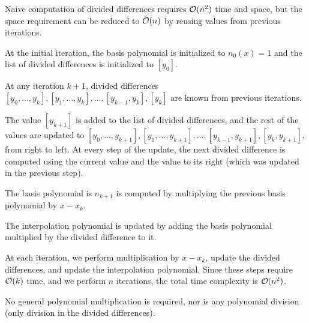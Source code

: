 Naive computation of divided differences requires $\mathcal{O}(n^2)$ time and space, but the space requirement can be reduced to $\mathcal{O}(n)$ by reusing values from previous iterations.

At the initial iteration, the basis polynomial is initialized to $n_0(x) = 1$ and the list of divided differences is initialized to $[y_0]$.

At any iteration $k + 1$, divided differences $[y_0, \ldots, y_k], [y_1, \ldots, y_k], \ldots, [y_{k-1}, y_k], [y_k]$ are known from previous iterations.

The value $[y_{k+1}]$ is added to the list of divided differences, and the rest of the values are updated to
$[y_0, \ldots, y_{k+1}], [y_1, \ldots, y_{k+1}], \ldots, [y_{k-1}, y_{k+1}], [y_k, y_{k+1}]$, from right to left.
At every step of the update, the next divided difference is computed using the current value and the value to its right (which was updated in the previous step).

The basis polynomial is $n_{k+1}$ is computed by multiplying the previous basis polynomial by $x - x_k$.

The interpolation polynomial is updated by adding the basis polynomial multiplied by the divided difference to it.

At each iteration, we perform multiplication by $x - x_k$, update the divided differences, and update the interpolation polynomial.
Since these steps require $\mathcal{O}(k)$ time, and we perform $n$ iterations, the total time complexity is $\mathcal{O}(n^2)$.

No general polynomial multiplication is required, nor is any polynomial division (only  division in the divided differences).
